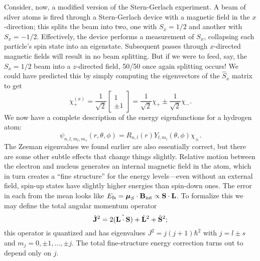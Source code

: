 \documentclass[../p052main.tex]{subfiles}
\begin{document}
Consider, now, a modified version of the Stern-Gerlach experiment.
A beam of silver atoms is fired through a Stern-Gerlach device with a magnetic field in the $x$-direction; this splits the beam into two, one with $S_x = 1 / 2$ and another with $S_x = -1 / 2$.
Effectively, the device performs a measurement of $S_x$, collapsing each particle's spin state into an eigenstate.
Subsequent passes through $x$-directed magnetic fields will result in no beam splitting.
But if we were to feed, say, the $S_x = 1 / 2$ beam into a $z$-directed field, 50/50 once again splitting occurs!
We could have predicted this by simply computing the eigenvectors of the $\hat S_x$ matrix to get
\[ \chi_+^{(x)} = \frac{1}{\sqrt{2}} \begin{bmatrix} 1 \\ \pm 1 \end{bmatrix} = \frac{1}{\sqrt{2}} \chi_+ \pm \frac{1}{\sqrt{2}} \chi_-. \]
We now have a complete description of the energy eigenfunctions for a hydrogen atom:
\[ \psi_{n,l,m_l,m_s}(r,\theta,\phi) = R_{n,l}(r) Y_{l,m_l}(\theta,\phi) \chi_\pm. \]
The Zeeman eigenvalues we found earlier are also essentially correct, but there are some other subtle effects that change things slightly.
Relative motion between the electron and nucleus generates an internal magnetic field in the atom, which in turn creates a ``fine structure'' for the energy levels---even without an external field, spin-up states have slightly higher energies than spin-down ones.
The error in each from the mean looks like $E_\textrm{fs} = \boldsymbol\mu_S \cdot \mathbf{B}_\textrm{int} \propto \mathbf{S} \cdot \mathbf{L}$.
To formalize this we may define the total angular momentum operator
\[ \hat{\mathbf{J}}^2 = 2\hat{(\mathbf{L} \cdot \mathbf{S})} + \hat{\mathbf{L}}^2 + \hat{\mathbf{S}}^2; \]
this operator is quantized and has eigenvalues $J^2 = j(j+1)\hbar^2$ with $j = l \pm s$ and $m_j = 0, \pm 1, \ldots, \pm j$.
The total fine-structure energy correction turns out to depend only on $j$.
\end{document}
